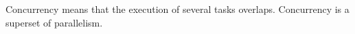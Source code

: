 Concurrency means that the execution of several tasks overlaps. Concurrency is a superset of parallelism.